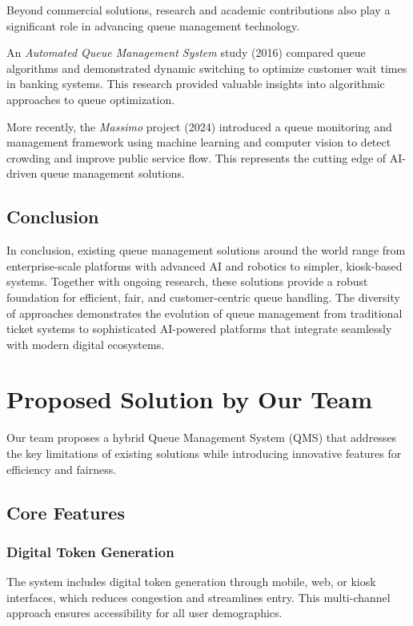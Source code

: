 \documentclass[12pt,a4paper]{report}
\begin{document}
Beyond commercial solutions, research and academic contributions also play a significant role in advancing queue management technology.

An \textit{Automated Queue Management System} study (2016) compared queue algorithms and demonstrated dynamic switching to optimize customer wait times in banking systems. This research provided valuable insights into algorithmic approaches to queue optimization.

More recently, the \textit{Massimo} project (2024) introduced a queue monitoring and management framework using machine learning and computer vision to detect crowding and improve public service flow. This represents the cutting edge of AI-driven queue management solutions.

\section{Conclusion}

In conclusion, existing queue management solutions around the world range from enterprise-scale platforms with advanced AI and robotics to simpler, kiosk-based systems. Together with ongoing research, these solutions provide a robust foundation for efficient, fair, and customer-centric queue handling. The diversity of approaches demonstrates the evolution of queue management from traditional ticket systems to sophisticated AI-powered platforms that integrate seamlessly with modern digital ecosystems.

\newpage
\chapter{Proposed Solution by Our Team}

Our team proposes a hybrid Queue Management System (QMS) that addresses the key limitations of existing solutions while introducing innovative features for efficiency and fairness.

\section{Core Features}

\subsection{Digital Token Generation}

The system includes digital token generation through mobile, web, or kiosk interfaces, which reduces congestion and streamlines entry. This multi-channel approach ensures accessibility for all user demographics.
\end{document}
